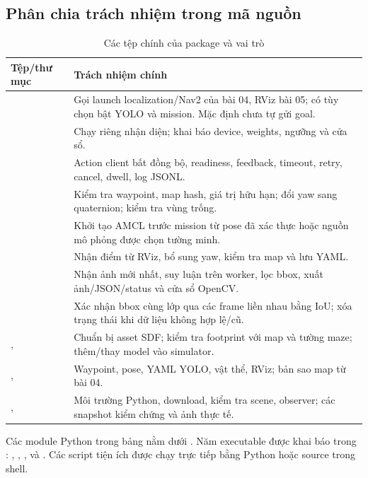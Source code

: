\subsection{Phân chia trách nhiệm trong mã nguồn}
\begin{table}[H]\centering\small
\caption{Các tệp chính của package và vai trò}\label{tab:files}
\begin{tabularx}{\linewidth}{@{}P{5.25cm}Y@{}}\toprule
Tệp/thư mục&Trách nhiệm chính\\\midrule
{}&Gọi launch localization/Nav2 của bài 04, RViz bài 05; có tùy chọn bật YOLO và mission. Mặc định chưa tự gửi goal.\\
&Chạy riêng nhận diện; khai báo device, weights, ngưỡng và cửa sổ.\\
&Action client bất đồng bộ, readiness, feedback, timeout, retry, cancel, dwell, log JSONL.\\
&Kiểm tra waypoint, map hash, giá trị hữu hạn; đổi yaw sang quaternion; kiểm tra vùng trống.\\
&Khởi tạo AMCL trước mission từ pose đã xác thực hoặc nguồn mô phỏng được chọn tường minh.\\
&Nhận điểm từ RViz, bổ sung yaw, kiểm tra map và lưu YAML.\\
&Nhận ảnh mới nhất, suy luận trên worker, lọc bbox, xuất ảnh/JSON/status và cửa sổ OpenCV.\\
&Xác nhận bbox cùng lớp qua các frame liền nhau bằng IoU; xóa trạng thái khi dữ liệu không hợp lệ/cũ.\\
,\newline{}&Chuẩn bị asset SDF; kiểm tra footprint với map và tường maze; thêm/thay model vào simulator.\\
, &Waypoint, pose, YAML YOLO, vật thể, RViz; bản sao map từ bài 04.\\
, &Môi trường Python, download, kiểm tra scene, observer; các snapshot kiểm chứng và ảnh thực tế.\\\bottomrule
\end{tabularx}\end{table}
Các module Python trong bảng nằm dưới . Năm executable được khai báo trong : , , ,  và . Các script tiện ích được chạy trực tiếp bằng Python hoặc source trong shell.

